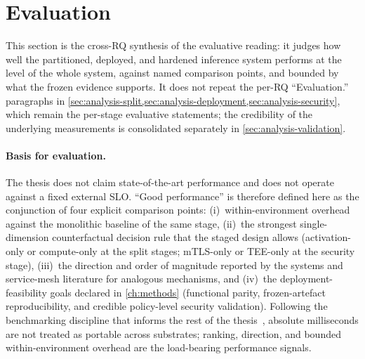 \section{Evaluation}
\label{sec:analysis-evaluation}

This section is the cross-RQ synthesis of the evaluative reading: it judges
how well the partitioned, deployed, and hardened inference system performs at
the level of the whole system, against named comparison points, and bounded
by what the frozen evidence supports. It does not repeat the per-RQ
``Evaluation.'' paragraphs in
\cref{sec:analysis-split,sec:analysis-deployment,sec:analysis-security},
which remain the per-stage evaluative statements; the credibility of the
underlying measurements is consolidated separately in
\cref{sec:analysis-validation}.

\paragraph{Basis for evaluation.}
The thesis does not claim state-of-the-art performance and does not
operate against a fixed external SLO. ``Good performance'' is therefore
defined here as the conjunction of four explicit comparison points:
(i)~within-environment overhead against the monolithic baseline of the
same stage, (ii)~the strongest single-dimension counterfactual decision
rule that the staged design allows (activation-only or compute-only at
the split stages; mTLS-only or TEE-only at the security stage),
(iii)~the direction and order of magnitude reported by the systems and
service-mesh literature for analogous mechanisms, and (iv)~the
deployment-feasibility goals declared in
\cref{ch:methods} (functional parity, frozen-artefact
reproducibility, and credible policy-level security validation).
Following the benchmarking discipline that informs the rest of the
thesis~\cite{benchmarking_sc15}, absolute milliseconds are not treated
as portable across substrates; ranking, direction, and bounded
within-environment overhead are the load-bearing performance signals.

